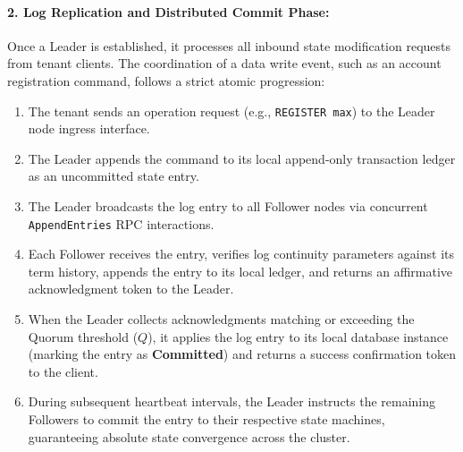 \paragraph{2. Log Replication and Distributed Commit Phase:}
Once a Leader is established, it processes all inbound state modification requests from tenant clients. The coordination of a data write event, such as an account registration command, follows a strict atomic progression:
\begin{enumerate}
    \item The tenant sends an operation request (e.g., \texttt{REGISTER max}) to the Leader node ingress interface.
    \item The Leader appends the command to its local append-only transaction ledger as an uncommitted state entry.
    \item The Leader broadcasts the log entry to all Follower nodes via concurrent \texttt{AppendEntries} RPC interactions.
    \item Each Follower receives the entry, verifies log continuity parameters against its term history, appends the entry to its local ledger, and returns an affirmative acknowledgment token to the Leader.
    \item When the Leader collects acknowledgments matching or exceeding the Quorum threshold ($Q$), it applies the log entry to its local database instance (marking the entry as \textbf{Committed}) and returns a success confirmation token to the client.
    \item During subsequent heartbeat intervals, the Leader instructs the remaining Followers to commit the entry to their respective state machines, guaranteeing absolute state convergence across the cluster.
\end{enumerate}

